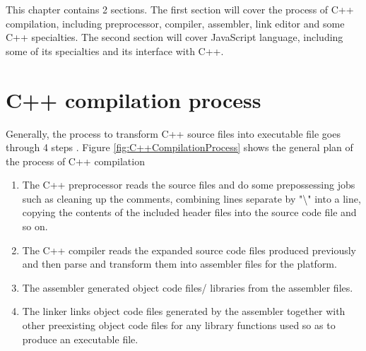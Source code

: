  \label{chap:Conceptions}
This chapter contains 2 sections. The first section will cover the process of C++ compilation, including preprocessor, compiler, assembler, link editor and some C++ specialties. The second section will cover JavaScript language, including some of its specialties and its interface with C++. 

\section{C++ compilation process}
    Generally, the process to transform C++ source files into executable file goes through 4 steps \footnotemark. Figure \ref{fig:C++CompilationProcess} shows the general plan of the process of C++ compilation
    
    \begin{enumerate}
        \item The C++ preprocessor reads the source files and  do some prepossessing jobs such as cleaning up the comments, combining lines separate by "\textbackslash"
        into a line, copying the contents of the included header files into the source code file and so on.

        \item The C++ compiler reads the expanded source code files produced previously and then parse and transform them into assembler files for the platform.

        \item The assembler generated object code files/ libraries from the assembler files.

        \item The linker links object code files generated by the assembler together with other preexisting object code files for any library functions used so as to produce an executable file.
    \end{enumerate}
    
